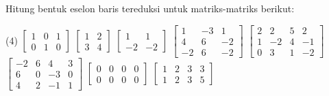 \begin{exercise}
Hitung bentuk eselon baris tereduksi untuk matriks-matriks berikut:
\begin{tasks}(4)
\task
$\begin{bmatrix}
1 & 0 & 1 \\
0 & 1 & 0
\end{bmatrix}$
\task
$\begin{bmatrix}
1 & 2 \\
3 & 4
\end{bmatrix}$
\task
$\begin{bmatrix}
1 & 1 \\
-2 & -2
\end{bmatrix}$
\task
$\begin{bmatrix}
1 & -3 & 1 \\
4 & 6 & -2 \\
-2 & 6 & -2
\end{bmatrix}$
\task
$\begin{bmatrix}
2 & 2 & 5 & 2 \\
1 & -2 & 4 & -1 \\
0 & 3 & 1 & -2
\end{bmatrix}$
\task
$\begin{bmatrix}
-2 & 6 & 4 & 3 \\
6 & 0 & -3 & 0 \\
4 & 2 & -1 & 1
\end{bmatrix}$
\task
$\begin{bmatrix}
0 & 0 & 0 & 0 \\
0 & 0 & 0 & 0
\end{bmatrix}$
\task
$\begin{bmatrix}
1 & 2 & 3 & 3 \\
1 & 2 & 3 & 5
\end{bmatrix}$
\end{tasks}
\end{exercise}
